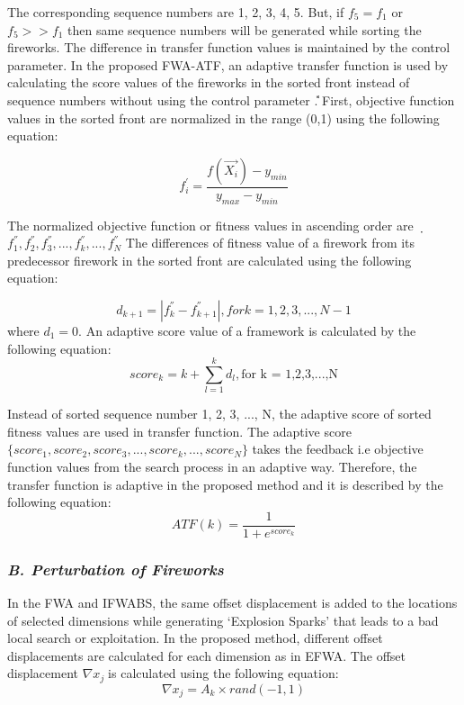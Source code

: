\documentclass[11pt, a4paper]{report}
\begin{document}
The corresponding sequence numbers are 1, 2, 3, 4, 5. But, if $ f_{5} = f_{1} $ or $ f_{5}>>f_{1} $ then same sequence numbers will be generated while sorting the fireworks. The difference in transfer function values is maintained by the control parameter. In the proposed FWA-ATF, an adaptive transfer function is used by calculating the score values of the fireworks in the sorted front instead of sequence numbers without using the control parameter ܽ. First, objective function values in the sorted front are normalized in the range (0,1) using the following equation:

\begin{equation}
f_{i}^{'} = \frac{f(\vec{X_{i}}) - y_{min}}{y_{max}-y_{min}}
\end{equation}

The normalized objective function or fitness values in ascending order are ݂$ f_{1}^{''},f_{2}^{''},f_{3}^{''},...,f_{k}^{''},...,f_{N}^{''} $
The differences of fitness value of a firework from its predecessor firework in the sorted front are calculated using the following equation:

\begin{equation}
d_{k+1} = |f_{k}^{''}-f_{k+1}^{''}|, for k = 1,2,3,...,N-1
\end{equation}
where $ d_{1}  = 0 $. An adaptive score value of a framework is calculated by the following equation:
\begin{equation}
score_{k} = k + \sum_{l=1}^{k}d_{l}, \text{for k = 1,2,3,...,N} 
\end{equation}

Instead of sorted sequence number 1, 2, 3, ..., N, the adaptive score of sorted fitness values are used in transfer function. The adaptive score $ \{ score_{1},score_{2},score_{3},...,score_{k},...,score_{N} \} $ takes the feedback i.e objective function values from the search process in an adaptive way. Therefore, the transfer function is adaptive in the proposed method and it is described by the following equation:
\begin{equation}
ATF(k) = \frac{1}{1+e^{score_{k}}}
\end{equation}

\subsubsection{\textit{B. Perturbation of Fireworks}}
In the FWA and IFWABS, the same offset displacement is added to the locations of selected dimensions while generating ‘Explosion Sparks’ that leads to a bad local search or exploitation. In the proposed method, different offset displacements are calculated for each dimension as in EFWA. The offset displacement $ \nabla x_{j}  $௝is calculated using the following equation:
\begin{equation}
\nabla x_{j} = A_{k} \times rand(-1,1)
\end{equation}
\end{document}
